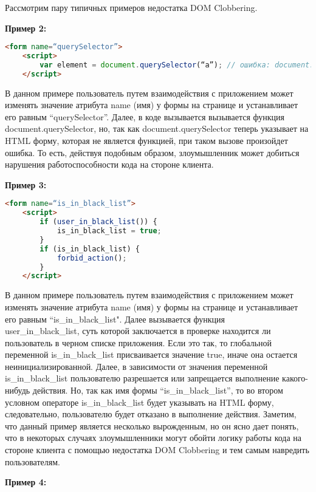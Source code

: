 Рассмотрим пару типичных примеров недостатка DOM Clobbering.

\bigskip
\textbf{Пример 2:}


\begin{lstlisting}[language=HTML]
	<form name=“querySelector”>
	<script>
		var element = document.querySelector(“a”); // ошибка: document.querySelector указывает на <form name=“querySelector”
	</script>
\end{lstlisting}
\bigskip

В данном примере пользователь путем взаимодействия с приложением может изменять значение атрибута name (имя) у формы на странице и устанавливает его равным “querySelector”. Далее, в коде вызывается вызывается функция document.querySelector, но, так как document.querySelector теперь указывает на HTML форму, которая не является функцией, при таком вызове произойдет ошибка.
То есть, действуя подобным образом, злоумышленник может добиться нарушения работоспособности кода на стороне клиента.

\bigskip
\textbf{Пример 3:}

\begin{lstlisting}[language=HTML]
	<form name=“is_in_black_list”>
	<script>
		if (user_in_black_list()) {
			is_in_black_list = true;
		}
		if (is_in_black_list) {
			forbid_action();
		}
	</script>
\end{lstlisting}
\bigskip

В данном примере пользователь путем взаимодействия с приложением может изменять значение атрибута name (имя) у формы на странице и устанавливает его равным “is\_in\_black\_list". Далее вызывается функция \\user\_in\_black\_list, суть которой заключается в проверке находится ли пользователь в черном списке приложения. Если это так, то глобальной переменной is\_in\_black\_list присваивается значение true, иначе она остается неинициализированной. Далее, в зависимости от значения переменной is\_in\_black\_list пользователю разрешается или запрещается выполнение какого-нибудь действия. Но, так как имя формы  “is\_in\_black\_list”, то во втором условном операторе is\_in\_black\_list будет указывать на HTML форму, следовательно, пользователю будет отказано в выполнение действия.
Заметим, что данный пример является несколько вырожденным, но он ясно дает понять, что в некоторых случаях злоумышленники могут обойти логику работы кода на стороне клиента с помощью недостатка DOM Clobbering и тем самым навредить пользователям.

\bigskip
\textbf{Пример 4:}


